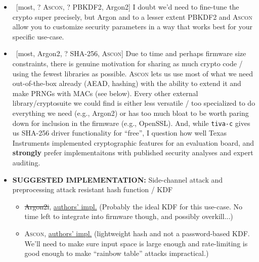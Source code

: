 \begin{itemize}
\begin{itemize}
        \item\ [\xmark most, ? A\textsc{scon}, ? PBKDF2, \cmark Argon2] I doubt we'd need to fine-tune the crypto super precisely, but Argon and to a lesser extent PBKDF2 and A\textsc{scon} allow you to customize security parameters in a way that works best for your specific use-case.
        \item\ [\xmark most, \xmark Argon2, \cmark? SHA-256, \cmark\cmark\cmark A\textsc{scon}] Due to time and perhaps firmware size constraints, there is genuine motivation for sharing as much crypto code / using the fewest libraries as possible. A\textsc{scon} lets us use most of what we need out-of-the-box already (AEAD, hashing) with the ability to extend it and make PRNGs with MACs (see below). Every other external library/cryptosuite we could find is either less versatile / too specialized to do everything we need (e.g., Argon2) or has too much bloat to be worth paring down for inclusion in the firmware (e.g., OpenSSL). And, while \texttt{tiva-c} gives us SHA-256 driver functionality for ``free'', I \jw{} question how well Texas Instruments implemented cryptographic features for an evaluation board, and \textbf{strongly} prefer implementaitons with published security analyses and expert auditing. 
        \item \textbf{SUGGESTED IMPLEMENTATION:} Side-channel attack and preprocessing attack resistant hash function / KDF
        \begin{itemize}
            \item \st{Argon2i}, \href{https://github.com/P-H-C/phc-winner-argon2}{authors' impl.} (Probably the ideal KDF for this use-case. No time left to integrate into firmware though, and possibly overkill...)
            \item A\textsc{scon}, \href{https://github.com/ascon/ascon-c}{authors' impl.} (lightweight hash and not a password-based KDF. We'll need to make sure input space is large enough and rate-limiting is good enough to make ``rainbow table'' attacks impractical.)

\end{itemize}
\end{itemize}
\end{itemize}
